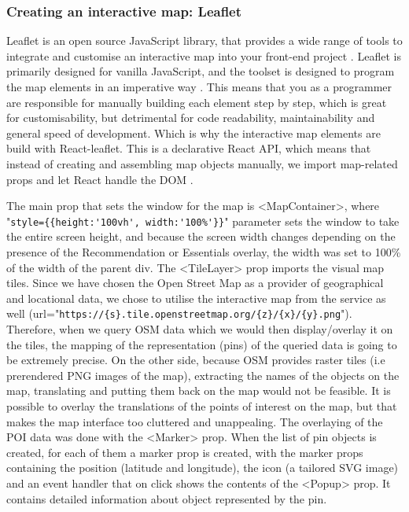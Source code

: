 \subsubsection{Creating an interactive map: Leaflet}

Leaflet is an open source JavaScript library, that provides a wide range of tools to integrate and customise an interactive map into your front-end project \cite{leafletMainPage}. Leaflet is primarily designed for vanilla JavaScript, and the toolset is designed to program the map elements in an imperative way \cite{LeafletImperative}. This means that you as a programmer are responsible for manually building each element step by step, which is great for customisability, but detrimental for code readability, maintainability and general speed of development. Which is why the interactive map elements are build with React-leaflet. This is a declarative React API, which means that instead of creating and assembling map objects manually, we import map-related props and let React handle the DOM \cite{LeafletDeclarative}.

The main prop that sets the window for the map is <MapContainer>, where "\lstinline|style={{height:'100vh', width:'100%'}}|" parameter sets the window to take the entire screen height, and because the screen width changes depending on the presence of the Recommendation or Essentials overlay, the width was set to 100\% of the width of the parent div. The <TileLayer> prop imports the visual map tiles. Since we have chosen the Open Street Map as a provider of geographical and locational data, we chose to utilise the interactive map from the service as well (url="\lstinline|https://{s}.tile.openstreetmap.org/{z}/{x}/{y}.png|"). Therefore, when we query OSM data which we would then display/overlay it on the tiles, the mapping of the representation (pins) of the queried data is going to be extremely precise. On the other side, because OSM provides raster tiles (i.e prerendered PNG images of the map), extracting the names of the objects on the map, translating and putting them back on the map would not be feasible. It is possible to overlay the translations of the points of interest on the map, but that makes the map interface too cluttered and unappealing. The overlaying of the POI data was done with the <Marker> prop. When the list of pin objects is created, for each of them a marker prop is created, with the marker props containing the position (latitude and longitude), the icon (a tailored SVG image) and an event handler that on click shows the contents of the <Popup> prop. It contains detailed information about object represented by the pin.

